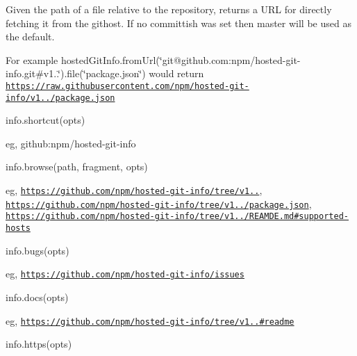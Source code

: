Given the path of a file relative to the repository, returns a U\+RL for directly fetching it from the githost. If no committish was set then {\ttfamily master} will be used as the default.

For example {\ttfamily hosted\+Git\+Info.\+from\+Url(\char`\"{}git@github.\+com\+:npm/hosted-\/git-\/info.\+git\#v1..\char`\"{}).file(\char`\"{}package.\+json\char`\"{})} would return {\ttfamily \href{https://raw.githubusercontent.com/npm/hosted-git-info/v1.0.0/package.json}{\tt https\+://raw.\+githubusercontent.\+com/npm/hosted-\/git-\/info/v1../package.\+json}}


\begin{DoxyItemize}
\item info.\+shortcut(opts)
\end{DoxyItemize}

eg, {\ttfamily github\+:npm/hosted-\/git-\/info}


\begin{DoxyItemize}
\item info.\+browse(path, fragment, opts)
\end{DoxyItemize}

eg, {\ttfamily \href{https://github.com/npm/hosted-git-info/tree/v1.2.0}{\tt https\+://github.\+com/npm/hosted-\/git-\/info/tree/v1..}}, {\ttfamily \href{https://github.com/npm/hosted-git-info/tree/v1.2.0/package.json}{\tt https\+://github.\+com/npm/hosted-\/git-\/info/tree/v1../package.\+json}}, {\ttfamily \href{https://github.com/npm/hosted-git-info/tree/v1.2.0/REAMDE.md#supported-hosts}{\tt https\+://github.\+com/npm/hosted-\/git-\/info/tree/v1../\+R\+E\+A\+M\+D\+E.\+md\#supported-\/hosts}}


\begin{DoxyItemize}
\item info.\+bugs(opts)
\end{DoxyItemize}

eg, {\ttfamily \href{https://github.com/npm/hosted-git-info/issues}{\tt https\+://github.\+com/npm/hosted-\/git-\/info/issues}}


\begin{DoxyItemize}
\item info.\+docs(opts)
\end{DoxyItemize}

eg, {\ttfamily \href{https://github.com/npm/hosted-git-info/tree/v1.2.0#readme}{\tt https\+://github.\+com/npm/hosted-\/git-\/info/tree/v1..\#readme}}


\begin{DoxyItemize}
\item info.\+https(opts)
\end{DoxyItemize}

